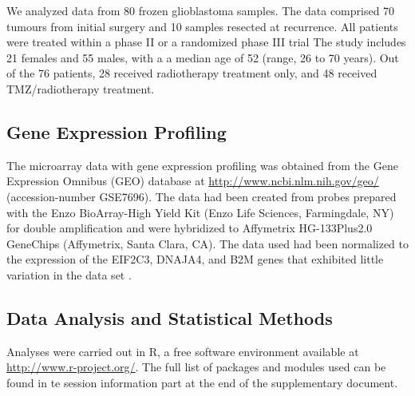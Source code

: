 \documentclass[9pt,twocolumn,twoside]{gsajnl}
\begin{document}
We analyzed data from 80 frozen glioblastoma samples. The data comprised 70 tumours from initial surgery and 10 samples resected at recurrence. All patients were treated within a phase II or a randomized phase III trial \citep{Stupp2002,Stupp2005}
The study includes 21 females and 55 males, with a a median age of 52 (range, 26 to 70 years). Out of the 76 patients, 28 received radiotherapy treatment only, and 48 received TMZ/radiotherapy treatment.

\subsection*{Gene Expression Profiling}

The microarray data with gene expression profiling was obtained from the Gene Expression Omnibus (GEO) database at \url{http://www.ncbi.nlm.nih.gov/geo/} (accession-number GSE7696). The data had been created from probes prepared with the Enzo BioArray-High Yield Kit (Enzo Life Sciences, Farmingdale, NY) for double amplification and were hybridized to Affymetrix HG-133Plus2.0 GeneChips (Affymetrix, Santa Clara, CA). The data used had been normalized to the expression of the EIF2C3, DNAJA4, and B2M genes that exhibited little variation in the data set \citep{Murat2008}.

\subsection*{Data Analysis and Statistical Methods}
Analyses were carried out in R, a free software environment available at \url{http://www.r-project.org/}. The full list of packages and modules used can be found in te session information part at the end of the supplementary document. 
\end{document}

